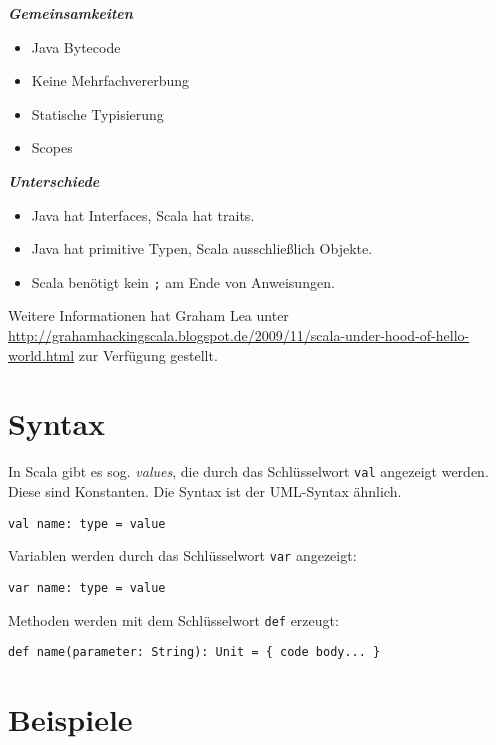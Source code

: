 \noindent\parbox[t]{2.4in}{\raggedright%
\textbf{\textit{Gemeinsamkeiten}}
\begin{itemize}[topsep=0pt,itemsep=-2pt,leftmargin=13pt]
    \item Java Bytecode
    \item Keine Mehrfachvererbung
    \item Statische Typisierung
    \item Scopes
\end{itemize}
}%
\parbox[t]{2.4in}{\raggedright%
\textbf{\textit{Unterschiede}}
\begin{itemize}[topsep=0pt,itemsep=-2pt,leftmargin=13pt]
    \item Java hat Interfaces, Scala hat traits.
    \item Java hat primitive Typen, Scala ausschließlich Objekte.
    \item Scala benötigt kein \texttt{;} am Ende von Anweisungen.
\end{itemize}
}

Weitere Informationen hat Graham Lea unter \url{http://grahamhackingscala.blogspot.de/2009/11/scala-under-hood-of-hello-world.html} zur Verfügung gestellt.

\section{Syntax}
In Scala gibt es sog. \textit{values}, die durch das Schlüsselwort \texttt{val}
angezeigt werden. Diese sind Konstanten. Die Syntax ist der UML-Syntax ähnlich.

\begin{verbatim}
val name: type = value
\end{verbatim}

Variablen werden durch das Schlüsselwort \texttt{var} angezeigt:

\begin{verbatim}
var name: type = value
\end{verbatim}

Methoden werden mit dem Schlüsselwort \texttt{def} erzeugt:

\begin{verbatim}
def name(parameter: String): Unit = { code body... }
\end{verbatim}

\section{Beispiele}

